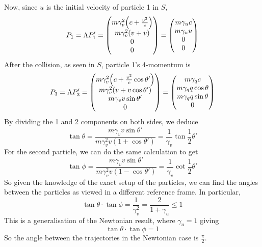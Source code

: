 Now, since $u$ is the initial velocity of particle 1 in $S$,
\[ P_1 = \Lambda P_1' = \begin{pmatrix}
		m\gamma_v^2 \qty(c + \frac{v^2}{c}) \\
		m\gamma_v^2 (v+v)                   \\
		0                                   \\
		0
	\end{pmatrix} = \begin{pmatrix}
		m\gamma_u c \\
		m\gamma_u u \\
		0           \\
		0
	\end{pmatrix} \]
After the collision, as seen in $S$, particle 1's 4-momentum is
\[ P_3 = \Lambda P_3' = \begin{pmatrix}
		m\gamma_v^2 \qty(c + \frac{v^2}{c}\cos\theta') \\
		m\gamma_v^2 \qty(v + v\cos\theta')             \\
		m\gamma_v v\sin\theta'                         \\
		0
	\end{pmatrix} = \begin{pmatrix}
		m\gamma_q c           \\
		m\gamma_q q\cos\theta \\
		m\gamma_q q\sin\theta \\
		0
	\end{pmatrix} \]
By dividing the 1 and 2 components on both sides, we deduce
\[ \tan\theta = \frac{m\gamma_v v\sin\theta'}{m\gamma_v^2 v(1 + \cos\theta')} = \frac{1}{\gamma_v} \tan\frac{1}{2}\theta' \]
For the second particle, we can do the same calculation to get
\[ \tan\phi = \frac{m\gamma_v v\sin\theta'}{m\gamma_v^2 v(1 - \cos\theta')} = \frac{1}{\gamma_v} \cot\frac{1}{2}\theta' \]
So given the knowledge of the exact setup of the particles, we can find the angles between the particles as viewed in a different reference frame. In particular,
\[ \tan\theta \cdot \tan\phi = \frac{1}{\gamma_v^2} = \frac{2}{1+\gamma_u} \leq 1 \]
This is a generalisation of the Newtonian result, where $\gamma_u = 1$ giving
\[ \tan\theta \cdot \tan\phi = 1 \]
So the angle between the trajectories in the Newtonian case is $\frac{\pi}{2}$.

